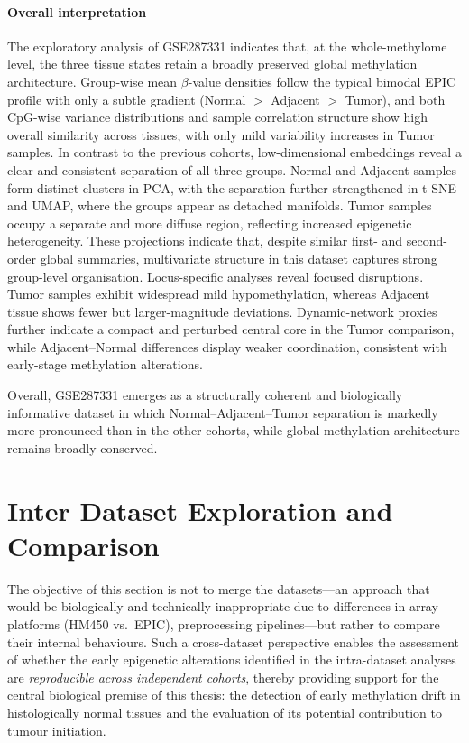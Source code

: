 \paragraph{Overall interpretation}

The exploratory analysis of GSE287331 indicates that, at the whole-methylome level,
the three tissue states retain a broadly preserved global methylation architecture. Group-wise mean $\beta$-value densities follow the typical bimodal EPIC profile
with only a subtle gradient (Normal $>$ Adjacent $>$ Tumor),
and both CpG-wise variance distributions and sample correlation structure
show high overall similarity across tissues, with only mild variability increases in Tumor samples.
In contrast to the previous cohorts, low-dimensional embeddings reveal
a clear and consistent separation of all three groups. Normal and Adjacent samples form distinct clusters in PCA,
with the separation further strengthened in t-SNE and UMAP,
where the groups appear as detached manifolds. Tumor samples occupy a separate and more diffuse region,
reflecting increased epigenetic heterogeneity. These projections indicate that, despite similar first- and second-order
global summaries, multivariate structure in this dataset
captures strong group-level organisation.
Locus-specific analyses reveal focused disruptions. Tumor samples exhibit widespread mild hypomethylation,
whereas Adjacent tissue shows fewer but larger-magnitude deviations.
Dynamic-network proxies further indicate a compact and perturbed
central core in the Tumor comparison,
while Adjacent–Normal differences display weaker coordination,
consistent with early-stage methylation alterations.

Overall, GSE287331 emerges as a structurally coherent and biologically
informative dataset in which Normal–Adjacent–Tumor separation
is markedly more pronounced than in the other cohorts,
while global methylation architecture remains broadly conserved.


\section{Inter Dataset Exploration and Comparison}
\label{sec:inter_dataset}

The objective of this section is not to merge the datasets—an approach that would be biologically and technically inappropriate due to differences in array platforms (HM450 vs.\ EPIC), preprocessing pipelines—but rather to compare their internal behaviours. Such a cross-dataset perspective enables the assessment of whether the early epigenetic alterations identified in the intra-dataset analyses are \emph{reproducible across independent cohorts}, thereby providing support for the central biological premise of this thesis: the detection of early methylation drift in histologically normal tissues and the evaluation of its potential contribution to tumour initiation.

